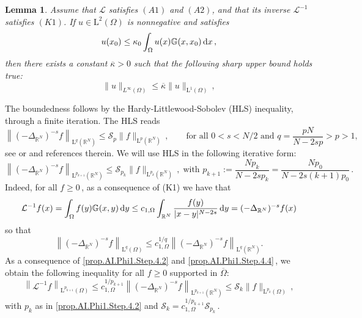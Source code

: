 \documentclass[11pt]{article}
\newtheorem{lem}[thm]{Lemma}
\numberwithin{equation}{section}
\newcommand{\dx}{\,{\rm d}x}
\newcommand{\dy}{\,{\rm d}y}
\def\LL{\mathrm{L}} %
\newcommand{\A}{\mathcal{L}}
\newcommand{\AI}{\mathcal{L}^{-1}}
\newcommand{\ka}{\overline{\kappa}}
\newcommand{\K}{{\mathbb G}}
\newcommand{\RR}{\mathbb{R}}
\begin{document}
\begin{lem}\label{Lem.bound.K1}Assume that $\A$ satisfies  $(A1)$ and $(A2)$, and that its inverse $\AI$ satisfies $(K1)$. If $u\in \LL^2(\Omega)$ is nonnegative and satisfies
\begin{equation}\label{Lem.Green.lineare.hyp-upper.K1}
 u(x_0) \le \kappa_0\int_{\Omega} u(x)\K(x,x_0)\dx\,,
\end{equation}
then there exists a constant $\ka>0$ such that the following sharp upper bound holds true:
\begin{equation}\label{Lem.Green.lineare.upper.K1}
\|u\|_{L^\infty(\Omega)}
\le \ka \|u\|_{\LL^{1}(\Omega)}\,,
\end{equation}
\end{lem}
The boundedness follows by the Hardy-Littlewood-Sobolev (HLS) inequality, through a finite iteration. The HLS reads
$$
\left\|(-\Delta_{\RR^N})^{-s}f\right\|_{\LL^q(\RR^N)}  \le \mathcal{S}_p \|f\|_{\LL^p(\RR^N)}\,,\qquad\mbox{for all $0<s<N/2$ and }q=\frac{pN}{N-2s p}>p>1,
$$
see \cite{LM} or \cite{BSV2013} and references therein. We will use HLS in the following iterative form:
\begin{equation}\label{prop.AI.Phi1.Step.4.2}
\left\|(-\Delta_{\RR^N})^{-s}f\right\|_{\LL^{p_{k+1}}(\RR^N)}  \le \mathcal{S}_{p_k} \|f\|_{\LL^{p_k}(\RR^N)}\,,
\;\mbox{with } p_{k+1}:=\frac{Np_k}{N-2s p_k}=\frac{Np_0}{N-2s(k+1)p_0}\,.
\end{equation}
Indeed, for all $f\ge 0$\,, as a consequence of (K1) we have that
$$
\AI f(x)=\int_\Omega f(y)\K(x,y)\dy \le c_{1,\Omega}\int_{\RR^N} \frac{f(y)}{|x-y|^{N-2s}}\dy=(-\Delta_{\RR^N})^{-s}f(x)
$$
so that
\begin{equation}\label{prop.AI.Phi1.Step.4.4}
\left\|(-\Delta_{\RR^N})^{-s}f\right\|_{\LL^q(\Omega)}\le c_{1,\Omega}^{1/q}\left\|(-\Delta_{\RR^N})^{-s}f\right\|_{\LL^q(\RR^N)}.
\end{equation}
As a consequence of  \eqref{prop.AI.Phi1.Step.4.2} and \eqref{prop.AI.Phi1.Step.4.4}\,, we obtain the following inequality for all $f\ge 0$ supported in $\overline{\Omega}$:
\begin{equation}\label{prop.AI.Phi1.Step.4.5}
\left\|\AI f\right\|_{\LL^{p_{k+1}}(\Omega)}\le c_{1,\Omega}^{1/p_{k+1}}\left\|(-\Delta_{\RR^N})^{-s}f\right\|_{\LL^{p_{k+1}}(\RR^N)}\le \mathcal{S}_k \|f\|_{\LL^{p_k}(\Omega)}\,,
\end{equation}
with $p_k$ as in \eqref{prop.AI.Phi1.Step.4.2} and $\mathcal{S}_k=c_{1,\Omega}^{1/p_{k+1}}\mathcal{S}_{p_k}$\,. \\
\end{document}
